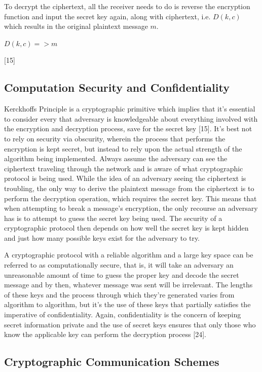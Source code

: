 \documentclass[conference,compsoc]{IEEEtran}
\begin{document}
To decrypt the ciphertext, all the receiver needs to do is reverse the encryption function and input the secret key again, along with ciphertext, i.e. $D(k, c)$ which results in the original plaintext message $m$.\\

\begin{center}
\large $D(k, c) => m$
\end{center}

\hfill [15]


\subsection{Computation Security and Confidentiality}
Kerckhoffs Principle is a cryptographic primitive which implies that it's essential to consider every that adversary is knowledgeable about everything involved with the encryption and decryption process, save for the secret key [15]. It's best not to rely on security via obscurity, wherein the process that performs the encryption is kept secret, but instead to rely upon the actual strength of the algorithm being implemented. Always assume the adversary can see the ciphertext traveling through the network and is aware of what cryptographic protocol is being used. While the idea of an adversary seeing the ciphertext is troubling, the only way to derive the plaintext message from the ciphertext is to perform the decryption operation, which requires the secret key. This means that when attempting to break a message’s encryption, the only recourse an adversary has is to attempt to guess the secret key being used. The security of a cryptographic protocol then depends on how well the secret key is kept hidden and just how many possible keys exist for the adversary to try. 

A cryptographic protocol with a reliable algorithm and a large key space can be referred to as computationally secure, that is, it will take an adversary an unreasonable amount of time to guess the proper key and decode the secret message and by then, whatever message was sent will be irrelevant. The lengths of these keys and the process through which they're generated varies from algorithm to algorithm, but it's the use of these keys that partially satisfies the imperative of confidentiality. Again, confidentiality is the concern of keeping secret information private and the use of secret keys ensures that only those who know the applicable key can perform the decryption process [24].

\subsection{Cryptographic  Communication Schemes}
\end{document}
